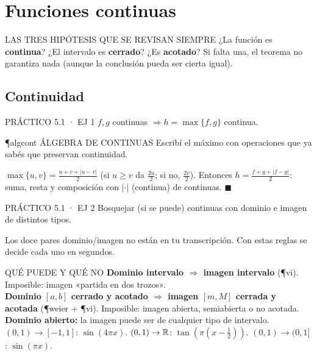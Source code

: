 \chapter{Funciones continuas}

\begin{memo}{LAS TRES HIPÓTESIS QUE SE REVISAN SIEMPRE}
¿La función es \textbf{continua}? ¿El intervalo es \textbf{cerrado}? ¿Es \textbf{acotado}? Si falta una, el teorema no garantiza nada (aunque la conclusión pueda ser cierta igual).
\end{memo}

\section{Continuidad}

\begin{enunciado}{PRÁCTICO 5.1 · EJ 1}
$f,g$ continuas $\Rightarrow h=\max\{f,g\}$ continua.
\end{enunciado}
\begin{uso}{\P{algcont} ÁLGEBRA DE CONTINUAS}
Escribí el máximo con operaciones que ya sabés que preservan continuidad.
\end{uso}
$\max\{u,v\}=\frac{u+v+|u-v|}2$ (si $u\ge v$ da $\frac{2u}2$; si no, $\frac{2v}2$). Entonces $h=\frac{f+g+|f-g|}2$: suma, resta y composición con $|\cdot|$ (continua) de continuas. $\blacksquare$

\begin{enunciado}{PRÁCTICO 5.1 · EJ 2}
Bosquejar (si se puede) continuas con dominio e imagen de distintos tipos.
\end{enunciado}
\begin{falta}
Los doce pares dominio/imagen no están en tu transcripción. Con estas reglas se decide cada uno en segundos.
\end{falta}
\begin{sello}{QUÉ PUEDE Y QUÉ NO}
\textbf{Dominio intervalo $\Rightarrow$ imagen intervalo} (\P{vi}). Imposible: imagen «partida en dos trozos».\\
\textbf{Dominio $[a,b]$ cerrado y acotado $\Rightarrow$ imagen $[m,M]$ cerrada y acotada} (\P{weier} + \P{vi}). Imposible: imagen abierta, semiabierta o no acotada.\\
\textbf{Dominio abierto:} la imagen puede ser de cualquier tipo de intervalo. $(0,1)\to[-1,1]$: $\sin(4\pi x)$. $(0,1)\to\mathbb{R}$: $\tan(\pi(x-\frac12))$. $(0,1)\to(0,1]$: $\sin(\pi x)$.
\end{sello}

